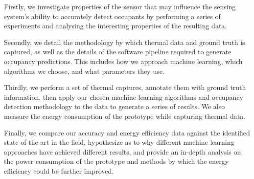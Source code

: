 \documentclass[../thesis/thesis.tex]{subfiles}
\begin{document}
\begin{enumerate}
Firstly, we investigate properties of the sensor that may influence the sensing system's ability to accurately detect occupants by performing a series of experiments and analysing the interesting properties of the resulting data.

Secondly, we detail the methodology by which thermal data and ground truth is captured, as well as the details of the software pipeline required to generate occupancy predictions. This includes how we approach machine learning, which algorithms we choose, and what parameters they use.

Thirdly, we perform a set of thermal captures, annotate them with ground truth information, then apply our chosen machine learning algorithms and occupancy detection methodology to the data to generate a series of results. We also measure the energy consumption of the prototype while capturing thermal data.

Finally, we compare our accuracy and energy efficiency data against the identified state of the art in the field, hypothesize as to why different machine learning approaches have achieved different results, and provide an in-depth analysis on the power consumption of the prototype and methods by which the energy efficiency could be further improved.
\end{enumerate}

\end{document}
